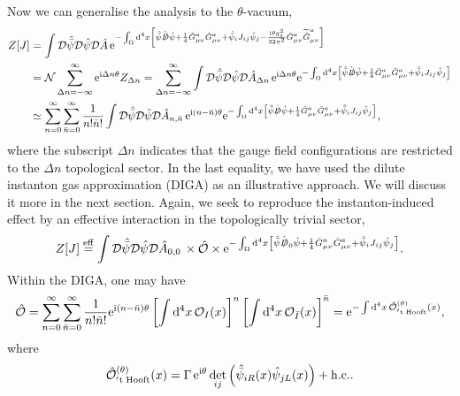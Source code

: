 \documentclass[review]{elsarticle}
\numberwithin{equation}{section}
\numberwithin{table}{section}
\numberwithin{figure}{section}
\def\d{\mathrm{d}}
\def\O{\mathcal{O}}
\def\i{\mathrm{i}}
\def\e{\mathrm{e}}
\def\hc{{\rm h.c.}}
\begin{document}
Now we can generalise the analysis to the $\theta$-vacuum,
\begin{align}
    Z[J] 
    &= \int\mathcal{D}\hat{\bar\psi} \mathcal{D}\hat\psi\mathcal{D}\hat A\,\e^{-\int_\Omega \d^4x\left[\hat{\bar\psi}\hat{\slashed{D}}\hat\psi+\frac{1}{4}\hat G_{\mu\nu}^a\hat G_{\mu\nu}^a+\hat{\bar\psi}_i J_{ij}\hat\psi_j -\frac{\i\theta g_s^2}{32\pi^2} \hat{G}^a_{\mu\nu}\widetilde{\hat{G}}^a_{\mu\nu}\right]}\notag\\
    &= \mathcal{N} \sum_{\Delta n=-\infty}^{\infty}\e^{\i\Delta n\theta}Z_{\Delta n}=\sum_{\Delta n=-\infty}^\infty \int \mathcal{D}\hat{\bar\psi} \mathcal{D}\hat\psi \mathcal{D}\hat A_{\Delta n} \,\e^{\i \Delta n\theta}\e^{-\int_\Omega \d^4x \left[\hat{\bar\psi}\hat{\slashed{D}}\hat\psi+\frac{1}{4} \hat G_{\mu\nu}^a\hat G_{\mu\nu}^a +\hat{\bar\psi}_i J_{ij}\hat\psi_j\right]} \notag\\ 
    &\simeq\sum_{n=0}^\infty \sum_{\bar n=0}^{\infty}\frac{1}{n!\bar{n}!}\int \mathcal{D}\hat{\bar\psi} \mathcal{D}\hat\psi \mathcal{D}\hat A_{n,\bar{n}} \,\e^{\i (n-\bar n)\theta}\e^{-\int_\Omega \d^4x \left[\hat{\bar\psi}\hat{\slashed{D}} \hat\psi+\frac{1}{4} \hat G_{\mu\nu}^a\hat G_{\mu\nu}^a +\hat{\bar\psi}_i J_{ij}\hat\psi_j\right]},
\end{align}
where the subscript $\Delta n$ indicates that the gauge field configurations are restricted to the $\Delta n$ topological sector. In the last equality, we have used the dilute instanton gas approximation (DIGA) as an illustrative approach. We will discuss it more in the next section. Again, we seek to reproduce the instanton-induced effect by an effective interaction in the topologically trivial sector,
\begin{align}
    Z[J]\overset{\rm eff}{=}\int\mathcal{D}\hat{\bar\psi}\mathcal{D}\hat\psi\mathcal{D}\hat A_{0,0}\,\times\hat{\mathcal{O}}
    \times 
    \e^{-\int_\Omega \d^4x\left[\hat{\bar\psi} \hat{\slashed{D}}_0\hat\psi+\frac{1}{4} \hat G_{\mu\nu}^a\hat G_{\mu\nu}^a +\hat{\bar\psi}_i J_{ij}\hat\psi_j \right]}. \label{eq:thooft_effective_matching-2}
\end{align}
Within the DIGA, one may have~\cite{tHooft:1986ooh}
\begin{align}
   \hat{\mathcal{O}} = \sum_{n=0}^\infty\sum_{\bar{n}=0}^\infty \frac{1}{n!{\bar n}!} \e^{\i(n-\bar n)\theta} \left[\int\d^4 x\,\O_{I}(x)\right]^{n}  \left[\int\d^4 x\,\O_{\bar I}(x)\right]^{\bar n}=\e^{-\int\d^4 x\,\hat{\O}^{(\theta)}_{\rm 't\; Hooft}(x) },
\end{align}
where
\begin{align}
    \hat{\O}^{(\theta)}_{\rm 't\; Hooft}(x) = \Gamma\,\e^{\i\theta} \det_{ij}\left(\hat{\bar{\psi}}_{iR}(x)\hat{\psi}_{jL}(x)\right)  + \hc .
    \label{eq:Hooft-operator1}
\end{align}
\end{document}
